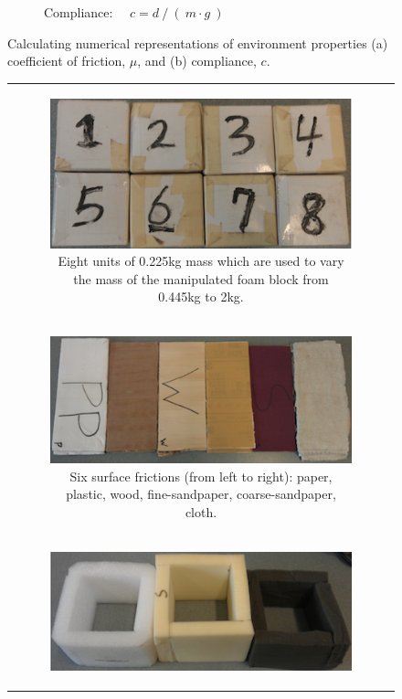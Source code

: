 \begin{figure}[]
\begin{subfigure}[]{0.490\linewidth}
        \caption{Compliance: ~~$c = d~/~(~m \cdot g~)$}
        \label{fig:compliance}
    \end{subfigure}
    \caption{Calculating numerical representations of environment properties (a) coefficient of friction, $\mu$, and (b) compliance, $c$.}
    \label{fig:property_calc}
\end{figure}

\begin{figure}[]
    \begin{tabular}{c}
        \begin{subfigure}[]{1\linewidth}
            \includegraphics[width=\linewidth]{images/setup_m}
            \caption{Eight units of 0.225kg mass which are used to vary the mass of the manipulated foam block from 0.445kg to 2kg.}
        \end{subfigure} \\
        \begin{subfigure}[]{1\linewidth}
            \includegraphics[width=\linewidth]{images/setup_f}
            \caption{Six surface frictions (from left to right): paper, plastic, wood, fine-sandpaper, coarse-sandpaper, cloth.}
        \end{subfigure} \\
        \begin{subfigure}[]{1\linewidth}
            \includegraphics[width=\linewidth]{images/setup_c}

\end{subfigure}
\end{tabular}
\end{figure}
